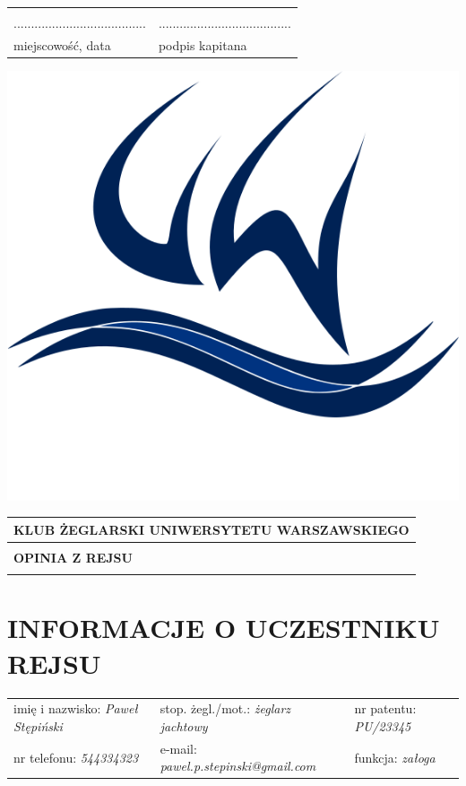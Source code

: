 \documentclass{article}
\begin{document}
\begin{tabularx}{\textwidth}{X X}
\\\\
...................................... & ......................................\\
miejscowość, data & podpis kapitana\\
\end{tabularx}
\newpage
\begin{minipage}{0.11\textwidth}
\includegraphics[width=\textwidth]{logo.png}
\end{minipage}
\begin{minipage}{0.89\textwidth}
\begin{tabularx}{\textwidth} { 
  | >{\centering\arraybackslash}X | }
 \hline
 \textbf{KLUB ŻEGLARSKI UNIWERSYTETU WARSZAWSKIEGO} \\
 \hline
 \\
 \textbf{\huge OPINIA Z REJSU} \\
 \\
\hline
\end{tabularx}
\end{minipage}

\section*{INFORMACJE O UCZESTNIKU REJSU}
\begin{tabularx}{\textwidth}{X X X}
imię i nazwisko: \textit{Paweł Stępiński} & stop. żegl./mot.: \textit{żeglarz jachtowy} & nr patentu: \textit{PU/23345} \\
nr telefonu: \textit{544334323} & e-mail: \textit{pawel.p.stepinski@gmail.com} & funkcja: \textit{załoga} \\
\end{tabularx}
\end{document}
